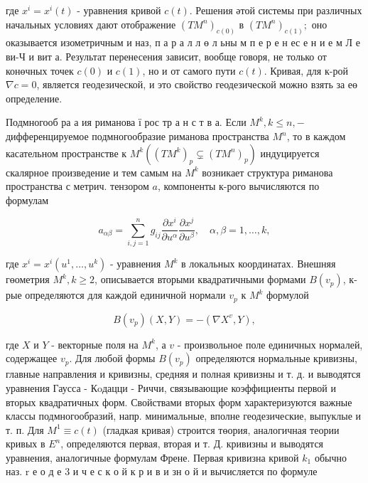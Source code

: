 \documentclass[10pt]{article}
\begin{document}
где $x^{i}=x^{i}(t)$ - уравнения кривой $c(t)$. Решения әтой системы при различных начальных условиях дают отображение $\left(T M^{n}\right)_{c(0)}$ в $\left(T M^{n}\right)_{c(1)} ;$ оно оказывается изометричным и наз, п а р а л л ө л ьны м п е р е н ес е н и е м Л е ви-Ч и вит а. Результат перенесения зависит, вообще говоря, не только от конөчных точек $c(0)$ и $c(1)$, но и от самого пути $c(t)$. Кривая, для к-рой $\nabla c=0$, является геодезической, и это свойство геодезической можно взять за еө определение.



Подмногооб ра а ия риманова ї рос тр а н с т в а. Если $M^{k}, k \leqslant n,-$ дифференцируемое подмногообразие риманова пространства $M^{n}$, то в каждом касательном пространстве к $M^{k}\left(\left(T M^{k}\right)_{p} \subsetneq\left(T M^{n}\right)_{p}\right)$ индуцируется скалярное произведение и тем самым на $M^{k}$ возникает структура риманова пространства с метрич. тензором $a$, компоненты к-рого вычисляются по формулам



\[

a_{\alpha \beta}=\sum_{i, j=1}^{n} g_{i j} \frac{\partial x^{i}}{\partial u^{\alpha}} \frac{\partial x^{j}}{\partial u^{\beta}}, \quad \alpha, \beta=1, \ldots, k,

\]



где $x^{i}=x^{i}\left(u^{1}, \ldots, u^{k}\right)$ - уравнения $M^{k}$ в локальных координатах. Внешняя гөометрия $M^{k}, k \geqslant 2$, описывается вторыми квадратичными формами $B\left(v_{p}\right)$, к-рые определяются для каждой единичной нормали $v_{p}$ к $M^{k}$ формулой



\[

B\left(v_{p}\right)(X, Y)=-\left(\nabla X^{v}, Y\right),

\]



где $X$ и $Y$ - векторные поля на $M^{k}$, а $v$ - произвольное поле единичных нормалей, содержащее $v_{p}$. Для любой формы $B\left(v_{p}\right)$ определяются нормальные кривизны, главные направления и кривизны, средняя и полная кривизны и т. д. и выводятся уравнения Гаусса - Кoдацци - Риччи, связывающие коэффициенты первой и вторых квадратичных форм. Свойствами вторых форм характеризуются важные классы подмногообразий, напр. минимальные, вполне геодезические, выпуклые и т. п. Для $M^{1} \equiv c(t)$ (гладкая кривая) строится төория, аналогичная теории кривых в $E^{n}$, определяются первая, вторая и т. Д. кривизны и выводятся уравнения, аналогичные формулам Френе. Первая кривизна кривой $k_{1}$ обычно наз. $\mathrm{r}$ е о д е 3 и ч е с к о й к р и в и зн о й и вычисляется по формуле
\end{document}
